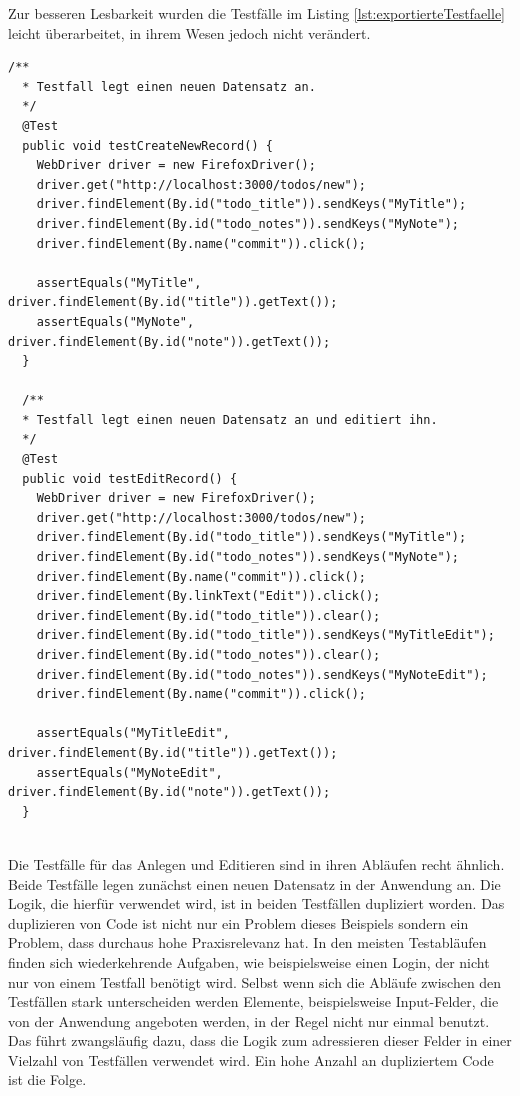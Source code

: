 Zur besseren Lesbarkeit wurden die Testfälle im Listing \ref{lst:exportierteTestfaelle} leicht überarbeitet, in ihrem Wesen jedoch nicht verändert.\\
\begin{lstlisting}[caption={Exportierte Testfälle},label={lst:exportierteTestfaelle}]
  /**
  * Testfall legt einen neuen Datensatz an.
  */
  @Test
  public void testCreateNewRecord() {
    WebDriver driver = new FirefoxDriver();
    driver.get("http://localhost:3000/todos/new");
    driver.findElement(By.id("todo_title")).sendKeys("MyTitle");
    driver.findElement(By.id("todo_notes")).sendKeys("MyNote");
    driver.findElement(By.name("commit")).click();
  
    assertEquals("MyTitle", driver.findElement(By.id("title")).getText());
    assertEquals("MyNote", driver.findElement(By.id("note")).getText());
  }
  
  /**
  * Testfall legt einen neuen Datensatz an und editiert ihn.
  */
  @Test
  public void testEditRecord() {
    WebDriver driver = new FirefoxDriver();
    driver.get("http://localhost:3000/todos/new");
    driver.findElement(By.id("todo_title")).sendKeys("MyTitle");
    driver.findElement(By.id("todo_notes")).sendKeys("MyNote");
    driver.findElement(By.name("commit")).click();
    driver.findElement(By.linkText("Edit")).click();
    driver.findElement(By.id("todo_title")).clear();
    driver.findElement(By.id("todo_title")).sendKeys("MyTitleEdit");
    driver.findElement(By.id("todo_notes")).clear();
    driver.findElement(By.id("todo_notes")).sendKeys("MyNoteEdit");
    driver.findElement(By.name("commit")).click();
    
    assertEquals("MyTitleEdit", driver.findElement(By.id("title")).getText());
    assertEquals("MyNoteEdit", driver.findElement(By.id("note")).getText());
  }
  
\end{lstlisting}
Die Testfälle für das Anlegen und Editieren sind in ihren Abläufen recht ähnlich. Beide Testfälle legen zunächst einen neuen Datensatz in der Anwendung an. Die Logik, die hierfür verwendet wird, ist in beiden Testfällen dupliziert worden. Das duplizieren von Code ist nicht nur ein Problem dieses Beispiels sondern ein Problem, dass durchaus hohe Praxisrelevanz hat. In den meisten Testabläufen finden sich wiederkehrende Aufgaben, wie beispielsweise einen Login, der nicht nur von einem Testfall benötigt wird.
Selbst wenn sich die Abläufe zwischen den Testfällen stark unterscheiden werden Elemente, beispielsweise Input-Felder, die von der Anwendung angeboten werden, in der Regel nicht nur einmal benutzt. Das führt zwangsläufig dazu, dass die Logik zum adressieren dieser Felder in einer Vielzahl von Testfällen verwendet wird. Ein hohe Anzahl an dupliziertem Code ist die Folge.\\
